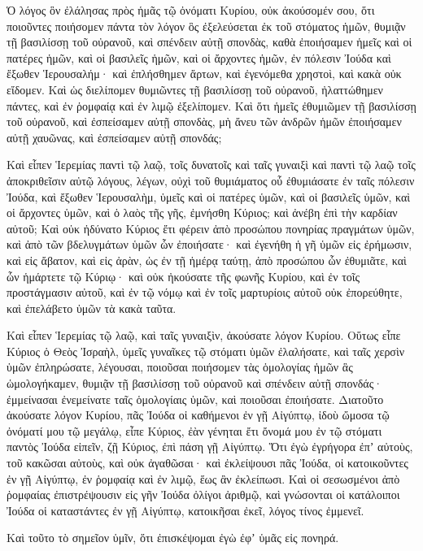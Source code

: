{\par }{\PP {}Ὁ λόγος ὃν ἐλάλησας πρὸς ἡμᾶς τῷ ὀνόματι Κυρίου, οὐκ ἀκούσομέν σου,
ὅτι ποιοῦντες ποιήσομεν πάντα τὸν λόγον ὃς ἐξελεύσεται ἐκ τοῦ στόματος ἡμῶν, θυμιᾷν τῇ βασιλίσσῃ τοῦ οὐρανοῦ, καὶ σπένδειν αὐτῇ σπονδὰς, καθὰ ἐποιήσαμεν ἡμεῖς καὶ οἱ πατέρες ἡμῶν, καὶ οἱ βασιλεῖς ἡμῶν, καὶ οἱ ἄρχοντες ἡμῶν, ἐν πόλεσιν Ἰούδα καὶ ἔξωθεν Ἱερουσαλήμ· καὶ ἐπλήσθημεν ἄρτων, καὶ ἐγενόμεθα χρηστοὶ, καὶ κακὰ οὐκ εἴδομεν.
Καὶ ὡς διελίπομεν θυμιῶντες τῇ βασιλίσσῃ τοῦ οὐρανοῦ, ἠλαττώθημεν πάντες, καὶ ἐν ῥομφαίᾳ καὶ ἐν λιμῷ ἐξελίπομεν.
Καὶ ὅτι ἡμεῖς ἐθυμιῶμεν τῇ βασιλίσσῃ τοῦ οὐρανοῦ, καὶ ἐσπείσαμεν αὐτῇ σπονδὰς, μὴ ἄνευ τῶν ἀνδρῶν ἡμῶν ἐποιήσαμεν αὐτῇ χαυῶνας, καὶ ἐσπείσαμεν αὐτῇ σπονδάς;
\par }{\PP {}Καὶ εἶπεν Ἱερεμίας παντὶ τῷ λαῷ, τοῖς δυνατοῖς καὶ ταῖς γυναιξὶ καὶ παντὶ τῷ λαῷ τοῖς ἀποκριθεῖσιν αὐτῷ λόγους, λέγων,
οὐχὶ τοῦ θυμιάματος οὗ ἐθυμιάσατε ἐν ταῖς πόλεσιν Ἰούδα, καὶ ἔξωθεν Ἱερουσαλὴμ, ὑμεῖς καὶ οἱ πατέρες ὑμῶν, καὶ οἱ βασιλεῖς ὑμῶν, καὶ οἱ ἄρχοντες ὑμῶν, καὶ ὁ λαὸς τῆς γῆς, ἐμνήσθη Κύριος; καὶ ἀνέβη ἐπὶ τὴν καρδίαν αὐτοῦ;
Καὶ οὐκ ἠδύνατο Κύριος ἔτι φέρειν ἀπὸ προσώπου πονηρίας πραγμάτων ὑμῶν, καὶ ἀπὸ τῶν βδελυγμάτων ὑμῶν ὧν ἐποιήσατε· καὶ ἐγενήθη ἡ γῆ ὑμῶν εἰς ἐρήμωσιν, καὶ εἰς ἄβατον, καὶ εἰς ἀρὰν, ὡς ἐν τῇ ἡμέρᾳ ταύτῃ,
ἀπὸ προσώπου ὧν ἐθυμιᾶτε, καὶ ὧν ἡμάρτετε τῷ Κύριῳ· καὶ οὐκ ἠκούσατε τῆς φωνῆς Κυρίου, καὶ ἐν τοῖς προστάγμασιν αὐτοῦ, καὶ ἐν τῷ νόμῳ καὶ ἐν τοῖς μαρτυρίοις αὐτοῦ οὐκ ἐπορεύθητε, καὶ ἐπελάβετο ὑμῶν τὰ κακὰ ταῦτα.
\par }{\PP {}Καὶ εἶπεν Ἱερεμίας τῷ λαῷ, καὶ ταῖς γυναιξὶν, ἀκούσατε λόγον Κυρίου.
Οὕτως εἶπε Κύριος ὁ Θεὸς Ἰσραὴλ, ὑμεῖς γυναῖκες τῷ στόματι ὑμῶν ἐλαλήσατε, καὶ ταῖς χερσὶν ὑμῶν ἐπληρώσατε, λέγουσαι, ποιοῦσαι ποιήσομεν τὰς ὁμολογίας ἡμῶν ἃς ὡμολογήκαμεν, θυμιᾷν τῇ βασιλίσσῃ τοῦ οὐρανοῦ καὶ σπένδειν αὐτῇ σπονδάς· ἐμμείνασαι ἐνεμείνατε ταῖς ὁμολογίαις ὑμῶν, καὶ ποιοῦσαι ἐποιήσατε.
Διατοῦτο ἀκούσατε λόγον Κυρίου, πᾶς Ἰούδα οἱ καθήμενοι ἐν γῇ Αἰγύπτῳ, ἰδοὺ ὤμοσα τῷ ὀνόματί μου τῷ μεγάλῳ, εἶπε Κύριος, ἐὰν γένηται ἔτι ὄνομά μου ἐν τῷ στόματι παντὸς Ἰούδα εἰπεῖν, ζῇ Κύριος, ἐπὶ πάση γῇ Αἰγύπτῳ.
Ὅτι ἐγὼ ἐγρήγορα ἐπʼ αὐτοὺς, τοῦ κακῶσαι αὐτοὺς, καὶ οὐκ ἀγαθῶσαι· καὶ ἐκλείψουσι πᾶς Ἰούδα, οἱ κατοικοῦντες ἐν γῇ Αἰγύπτῳ, ἐν ῥομφαίᾳ καὶ ἐν λιμῷ, ἕως ἂν ἐκλείπωσι.
Καὶ οἱ σεσωσμένοι ἀπὸ ῥομφαίας ἐπιστρέψουσιν εἰς γῆν Ἰούδα ὀλίγοι ἀριθμῷ, καὶ γνώσονται οἱ κατάλοιποι Ἰούδα οἱ καταστάντες ἐν γῇ Αἰγύπτῳ, κατοικῆσαι ἐκεῖ, λόγος τίνος ἐμμενεῖ.
\par }{\PP {}Καὶ τοῦτο τὸ σημεῖον ὑμῖν, ὅτι ἐπισκέψομαι ἐγὼ ἐφʼ ὑμᾶς εἰς πονηρά.
}
